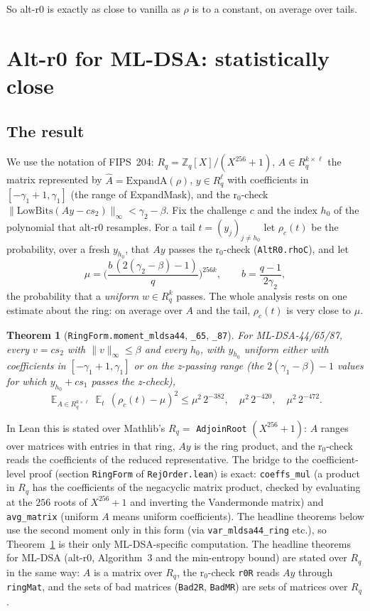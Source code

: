 \documentclass[11pt]{article}
\newtheorem{theorem}{Theorem}
\theoremstyle{definition}
\theoremstyle{remark}
\newcommand{\Z}{\mathbb{Z}}
\newcommand{\lean}[1]{\texttt{#1}}
\begin{document}
So alt-r0 is exactly as close to vanilla as $\rho$ is to a constant, on average over tails.

\section{Alt-r0 for ML-DSA: statistically close}\label{sec:altr0stat}

\subsection{The result}

We use the notation of FIPS~204: $R_q = \Z_q[X]/(X^{256}+1)$, $A \in R_q^{k\times\ell}$ the matrix
represented by $\hat A = \mathrm{ExpandA}(\rho)$, $y \in R_q^\ell$ with coefficients in
$[-\gamma_1+1,\gamma_1]$ (the range of ExpandMask), and the r$_0$-check
$\|\mathrm{LowBits}(Ay - cs_2)\|_\infty < \gamma_2-\beta$. Fix the challenge $c$ and the index
$h_0$ of the polynomial that alt-r0 resamples. For a tail $t = (y_j)_{j\ne h_0}$ let $\rho_c(t)$ be
the probability, over a fresh $y_{h_0}$, that $Ay$ passes the r$_0$-check
(\lean{AltR0.rhoC}), and let
\[
  \mu = \Big(\frac{b\,(2(\gamma_2-\beta)-1)}{q}\Big)^{256k},\qquad b = \frac{q-1}{2\gamma_2},
\]
the probability that a \emph{uniform} $w \in R_q^k$ passes. The whole analysis rests on one
estimate about the ring: on average over $A$ and the tail, $\rho_c(t)$ is very close to $\mu$.

\begin{theorem}[\lean{RingForm.moment\_mldsa44}, \lean{\_65}, \lean{\_87}]\label{thm:moment}
For ML-DSA-44/65/87, every $v = cs_2$ with $\|v\|_\infty \le \beta$ and every $h_0$, with
$y_{h_0}$ uniform either with coefficients in $[-\gamma_1+1,\gamma_1]$ or on the z-passing range
(the $2(\gamma_1-\beta)-1$ values for which $y_{h_0}+cs_1$ passes the z-check),
\[
  \mathop{\mathbb E}_{A \in R_q^{k\times\ell}} \mathop{\mathbb E}_t\, (\rho_c(t) - \mu)^2
  \le \mu^2\, 2^{-382},\quad \mu^2\, 2^{-420},\quad \mu^2\, 2^{-472}.
\]
\end{theorem}

In Lean this is stated over Mathlib's $R_q = $ \lean{AdjoinRoot} $(X^{256}+1)$: $A$ ranges over
matrices with entries in that ring, $Ay$ is the ring product, and the r$_0$-check reads the
coefficients of the reduced representative. The bridge to the coefficient-level proof (section
\lean{RingForm} of \lean{RejOrder.lean}) is exact: \lean{coeffs\_mul} (a product in $R_q$ has the
coefficients of the negacyclic matrix product, checked by evaluating at the $256$ roots of
$X^{256}+1$ and inverting the Vandermonde matrix) and \lean{avg\_matrix} (uniform $A$ means
uniform coefficients). The headline theorems below use the second moment only in this form (via
\lean{var\_mldsa44\_ring} etc.), so Theorem~\ref{thm:moment} is their only ML-DSA-specific
computation. The headline theorems for ML-DSA (alt-r0, Algorithm~3 and the min-entropy bound)
are stated over $R_q$ in the same way: $A$ is a matrix over $R_q$, the r$_0$-check \lean{r0R}
reads $Ay$ through \lean{ringMat}, and the sets of bad matrices (\lean{Bad2R}, \lean{BadMR}) are
sets of matrices over $R_q$.
\end{document}
